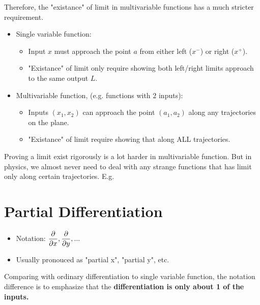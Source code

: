 \documentclass[class=article, crop=false, 12pt]{standalone}
\begin{document}
Therefore, the "existance" of limit in multivariable functions has a much stricter requirement.
\begin{itemize}
    \item Single variable function: 
    \begin{itemize}
        \item Input $x$ must approach the point $a$ from either left ($x^-$) or right ($x^+$).
        \item "Existance" of limit only require showing both left/right limits approach to the same output $L$.
    \end{itemize}
    
    \item Multivariable function, (e.g. functions with 2 inputs):
    \begin{itemize}
        \item Inputs $(x_1, x_2)$ can approach the point $(a_1, a_2)$ along any trajectories on the plane. 
        \item "Existance" of limit require showing that along ALL trajectories.
    \end{itemize}
\end{itemize}


 Proving a limit exist rigorously is a lot harder in multivariable function.
 But in physics, we almost never need to deal with any strange functions that has limit only along certain trajectories.
  E.g.

 





\linesep
\section{Partial Differentiation}

\begin{itemize}
    \item Notation: $\pdvv{x}, \pdvv{y}, ...$
    \item Usually pronouced as "partial x", "partial y", etc.
\end{itemize}

Comparing with ordinary differentiation to single variable function, 
the notation difference is to emphasize that the \bf{differentiation is only about 1 of the inputs}. 
\end{document}
